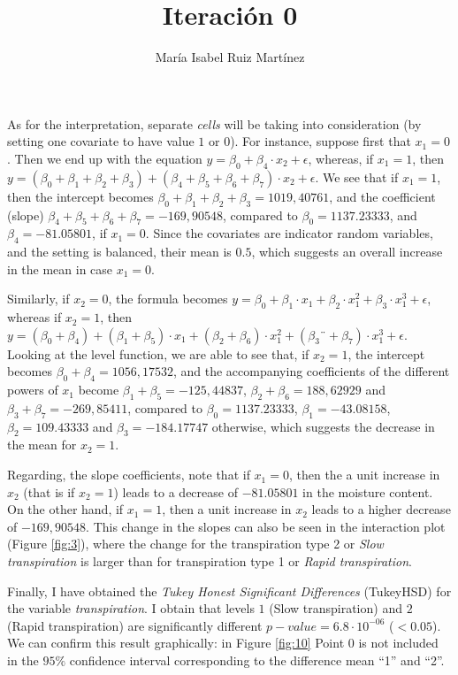 \documentclass[10pt,a4paper]{article}
\author{María Isabel Ruiz Martínez}
\title{Iteración 0}
\begin{document}
\maketitle

As for the interpretation, separate \emph{cells} will be taking into consideration (by setting one covariate to have value $1$ or $0$). For instance, suppose first that $x_1= 0$. Then we end up with the equation $y = \beta_0 + \beta_4 \cdot x_2 + \epsilon$, whereas, if $x_1= 1$, then $y = (\beta_0 + \beta_1 + \beta_2 + \beta_3) + (\beta_4 + \beta_5 + \beta_6 + \beta_7) \cdot x_2 + \epsilon$. We see that if $x_1= 1$, then the intercept becomes $\beta_0 + \beta_1 + \beta_2 + \beta_3 = 1019,40761$, and the coefficient (slope) $\beta_4 + \beta_5 + \beta_6 + \beta_7 = -169,90548$, compared to $\beta_0 = 1137.23333$, and $\beta_4 = -81.05801$, if $x_1= 0$. Since the covariates are indicator random variables, and the setting is balanced, their mean is $0.5$, which suggests an overall increase in the mean in case $x_1 = 0$.

Similarly, if $x_2= 0$, the formula becomes $y = \beta_0 + \beta_1 \cdot x_1 + \beta_2 \cdot x_1^2 + \beta_3 \cdot x_1^3 + \epsilon$, whereas if $x_2= 1$, then $y = (\beta_0 + \beta_4) + (\beta_1 + \beta_5) \cdot x_1 + (\beta_2 + \beta_6) \cdot x_1^2 + (\beta_3 ¨+ \beta_7) \cdot x_1^3 + \epsilon$. Looking at the level function, we are able to see that, if $x_2=1$, the intercept becomes $\beta_0 + \beta_4 = 1056,17532$, and the accompanying coefficients of the different powers of $x_1$ become $\beta_1 + \beta_5 = -125,44837$, $\beta_2 + \beta_6 = 188,62929$ and $\beta_3 + \beta_7 = -269,85411$, compared to $\beta_0 = 1137.23333$, $\beta_1 = -43.08158$, $\beta_2 = 109.43333$ and $\beta_3 = -184.17747$ otherwise, which suggests the decrease in the mean for $x_2= 1$.

Regarding, the slope coefficients, note that if $x_1= 0$, then the a unit increase in $x_2$ (that is if $x_2=1$) leads to a decrease of $-81.05801$ in the moisture content. On the other hand, if $x_1= 1$, then a unit increase in $x_2$ leads to a higher decrease of $-169,90548$. This change in the slopes can also be seen in the interaction plot (Figure \ref{fig:3}), where the change for the transpiration type 2 or \emph{Slow transpiration} is larger than for transpiration type 1 or \emph{Rapid transpiration}.

Finally, I have obtained the \emph{Tukey Honest Significant Differences} (TukeyHSD) for the variable \emph{transpiration}. I obtain that levels $1$ (Slow transpiration) and $2$ (Rapid transpiration) are significantly different $p-value = 6.8\cdot 10^{-06}$ ($< 0.05$). We can confirm this result graphically: in Figure \ref{fig:10} Point 0 is not included in the $95\%$ confidence interval corresponding to the difference mean “1” and “2”.
\end{document}
